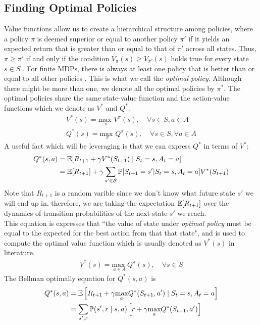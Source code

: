 \subsection{Finding Optimal Policies}
Value functions allow us to create a hierarchical structure among policies, where a policy $\pi$ is deemed superior or equal to another policy $\pi'$ if it yields an expected return that is greater than or equal to that of $\pi'$ across all states\cite{RL2}. Thus, $\pi \geq \pi'$ if and only if the condition $V_\pi(s) \geq V_{\pi'}(s)$ holds true for every state $s \in S$ \cite{mohri2018}. For finite MDPs, there is always at least one policy that is better than or equal to all other policies \cite{RL}. This is what we call the \textit{optimal policy}. Although there might be more than one, we denote all the optimal policies by $\pi^*$. The optimal policies share the same state-value function and the action-value functions which we denote as $V^{*}$ and $Q^{*}$\cite{RL2}.
\begin{align*}
    V^{*}(s) = \underset{\pi}{\text{max }} V^{\pi}(s), \quad  \forall s \in S, a \in A \\ 
    Q^{*}(s) = \underset{\pi}{\text{max }} Q^{\pi}(s), \quad  \forall s \in S, \forall a \in A
\end{align*}
A useful fact which will be leveraging is that we can express $Q^*$ in terms of $V^*$:
\begin{align*}
    Q^*(s,a) &= \mathbb E [R_{t+1} + \gamma V^*(S_{t+1}) \mid S_t = s, A_t =a ] \\ 
    &= \mathbb E [R_{t+1}]  + \gamma \sum_{ s' \in \mathcal{S}} \mathbb P[S_{t+1} =s'|S_t = s, A_t = a] V^*(S_{t+1})   
\end{align*}
Note that $R_{t+1}$ is a random varible since we don't know what future state $s'$ we will end up in, therefore, 
we are taking the expectation $\mathbb E [R_{t+1}]$ over the dynamics of transition probabilities of the next state $s'$ we reach. 
\\
 This equation is expresses that ``the value of  state under \textit{optimal policy} must be equal to the expected for the best action from that that state"\cite{RL}, and
is used to compute the optimal value function which is usually denoted as $V^*(s)$ in literature.
\begin{align*}
    V^*(s) = \underset{a \in A}{\text{max }} Q^{\pi}(s), \quad  \forall s \in S 
\end{align*}
The Bellman optimally equation for $Q^*(s,a)$ is 
\begin{align*}
    Q^{*}(s,a) &= \mathbb E \left [R_{t+1}
    + \gamma \underset{a}{\text{max}}Q^*(S_{t+1},a')  \mid S_{t} =s, A_t = a \right] \\
    &= \sum_{s',r}\mathbb P(s',r \mid s,a)
    \left [r + \gamma \underset{a}{\text{max}}Q^*(S_{t+1},a') 
    \right]
\end{align*}


